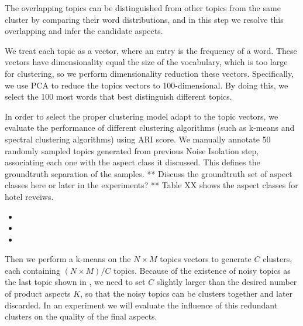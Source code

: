 The overlapping topics can be distinguished from other topics from the 
same cluster by comparing their word distributions, 
and in this step we resolve this overlapping and infer the candidate
aspects.

We treat each topic as a vector, where an entry is the frequency of a word. 
These vectors have dimensionality equal the size of the vocabulary, which is too large for clustering, 
so we perform dimensionality reduction these vectors.
Specifically, we use PCA to reduce the topics vectors to 100-dimensional. 
By doing this, we select the 100 most words that best distinguish different topics.

In order to select the proper clustering model adapt to the topic vectors, 
we evaluate the performance of different clustering algorithms
(such as k-means and spectral clustering algorithms) using ARI score.
We manually annotate 50 randomly sampled topics generated from previous Noise Isolation step, 
associating each one with the aspect class it discussed. 
This defines the groundtruth separation of the samples. 
** Discuss the groundtruth set of aspect classes here or later in the experiments? **
Table XX shows the aspect classes for hotel reveiws.


\begin{itemize}
    \item
    \item
    \item 

\end{itemize}

Then we perform a k-means on the $N\times M$ topics vectors to 
generate $C$ clusters, each containing $(N\times M)/C$ topics.
Because of the existence of noisy topics as the last topic shown 
in , we need to set $C$ slightly larger than 
the desired number of product aspects $K$,
so that the noisy topics can be clusters together and later discarded. 
In an experiment we will evaluate the influence of this redundant clusters on 
the quality of the final aspects.

